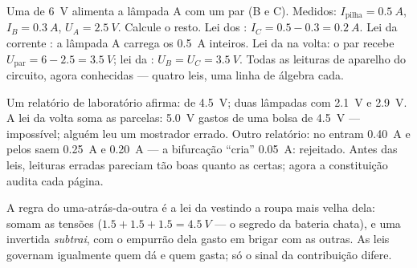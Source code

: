 \begin{example}\label{ex:g8:circuit-laws:worked}
Uma  de \qty{6}{V} alimenta a lâmpada A  com um par  (B e C). Medidos: $I_{\text{pilha}} = \qty{0.5}{A}$,
$I_B = \qty{0.3}{A}$, $U_A = \qty{2.5}{V}$. Calcule o resto. Lei dos
: $I_C = 0.5 - 0.3 = \qty{0.2}{A}$. Lei da corrente : a
lâmpada A carrega os \qty{0.5}{A} inteiros. Lei da  na volta: o
par recebe $U_{\text{par}} = 6 - 2.5 = \qty{3.5}{V}$; lei da 
: $U_B = U_C = \qty{3.5}{V}$. Todas as leituras de
aparelho do circuito, agora conhecidas --- quatro leis, uma linha de
álgebra cada.
\end{example}

\begin{example}\label{ex:g8:circuit-laws:liedetector}
Um relatório de laboratório afirma:  de \qty{4.5}{V}; duas
lâmpadas  com \qty{2.1}{V} e \qty{2.9}{V}. A lei da volta
soma as parcelas: \qty{5.0}{V} gastos de uma bolsa de \qty{4.5}{V}
--- impossível; alguém leu um mostrador errado. Outro relatório: no
 entram \qty{0.40}{A} e pelos  saem \qty{0.25}{A} e
\qty{0.20}{A} --- a bifurcação ``cria'' \qty{0.05}{A}: rejeitado.
Antes das leis, leituras erradas pareciam tão boas quanto as certas;
agora a constituição audita cada página.
\end{example}

\begin{remark}\label{rem:g8:circuit-laws:batteries}
A regra do uma-atrás-da-outra é a lei da   vestindo a
roupa mais velha dela:   somam as tensões
($1.5 + 1.5 + 1.5 = \qty{4.5}{V}$ --- o segredo da bateria chata), e
uma  invertida \emph{subtrai}, com o empurrão dela gasto em
brigar com as outras. As leis governam igualmente quem dá e quem
gasta; só o sinal da contribuição difere.
\end{remark}

